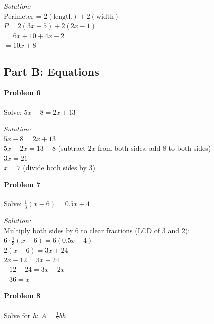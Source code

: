 \documentclass[12pt]{article}
\begin{document}
            \textit{Solution:}\\
            Perimeter = $2(\text{length}) + 2(\text{width})$\\
            $P = 2(3x + 5) + 2(2x - 1)$\\
            $= 6x + 10 + 4x - 2$\\
            $= 10x + 8$


            \newpage

            \subsection*{Part B: Equations}

            \textbf{Problem 6}\\\\
            Solve: $5x - 8 = 2x + 13$

            \textit{Solution:}\\
            $5x - 8 = 2x + 13$\\
            $5x - 2x = 13 + 8$ \quad (subtract $2x$ from both sides, add 8 to both sides)\\
            $3x = 21$\\
            $x = 7$ \quad (divide both sides by 3)


            \vspace{0.5cm}

            \textbf{Problem 7}\\\\
            Solve: $\displaystyle\frac{1}{3}(x - 6) = 0.5x + 4$

            \textit{Solution:}\\
            Multiply both sides by 6 to clear fractions (LCD of 3 and 2):\\
            $6 \cdot \displaystyle\frac{1}{3}(x - 6) = 6(0.5x + 4)$\\
            $2(x - 6) = 3x + 24$\\
            $2x - 12 = 3x + 24$\\
            $-12 - 24 = 3x - 2x$\\
            $-36 = x$


            \vspace{0.5cm}

            \textbf{Problem 8}\\\\
            Solve for $h$: $\displaystyle A = \frac{1}{2}bh$
\end{document}
